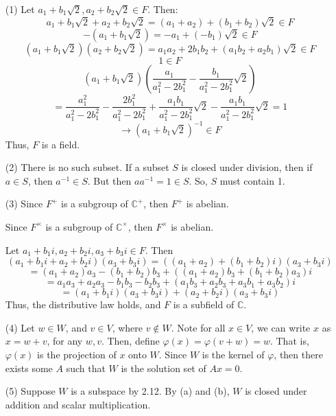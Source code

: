 %
%
\begin{itemize}
\item[(1)]
Let $a_1 + b_1\sqrt{2}, a_2 + b_2\sqrt{2} \in F$. Then:
$$a_1 + b_1\sqrt{2} + a_2 + b_2\sqrt{2} = (a_1 + a_2) + (b_1 + b_2)\sqrt{2} \in F$$
$$-(a_1 + b_1\sqrt{2}) = -a_1 + (-b_1)\sqrt{2} \in F$$
$$(a_1 + b_1\sqrt{2})(a_2 + b_2\sqrt{2}) = a_1a_2 + 2b_1b_2 + (a_1b_2 + a_2b_1)\sqrt{2} \in F$$
$$1 \in F$$
$$\left(a_1 + b_1\sqrt{2}\right)\left(\frac{a_1}{a_1^2 - 2b_1^2} - \frac{b_1}{a_1^2 - 2b_1^2}\sqrt{2}\right)$$
$$=\frac{a_1^2}{a_1^2 - 2b_1^2} - \frac{2b_1^2}{a_1^2 - 2b_1^2} + \frac{a_1b_1}{a_1^2 - 2b_1^2}\sqrt{2} - \frac{a_1b_1}{a_1^2 - 2b_1^2}\sqrt{2} = 1$$
$$\rightarrow (a_1 + b_1\sqrt{2})^{-1} \in F$$
Thus, $F$ is a field.
\item[(2)]
There is no such subset. If a subset $S$ is closed under division, then if $a \in S$, then $a^{-1} \in S$. But then $aa^{-1} = 1 \in S$. So, $S$ must contain 1.
\item[(3)]
Since $F^+$ is a subgroup of $\mathbb{C}^+$, then $F^+$ is abelian.

Since $F^\times$ is a subgroup of $\mathbb{C}^\times$, then $F^\times$ is abelian.

Let $a_1 + b_1i, a_2 + b_2i, a_3 + b_3i \in F$. Then
$$(a_1 + b_1i + a_2 + b_2i)(a_3 + b_3i) = ((a_1 + a_2) + (b_1 + b_2)i)(a_3 + b_3i)$$
$$= (a_1+ a_2)a_3 - (b_1 + b_2)b_3 + ((a_1 +a_2)b_3 + (b_1 + b_2)a_3)i$$
$$= a_1a_3 + a_2a_3 - b_1b_3 - b_2b_3 + (a_1b_3 + a_2b_3 + a_3b_1 + a_3b_2)i$$
$$= (a_1 + b_1i)(a_3 + b_3i) + (a_2 + b_2i)(a_3 + b_3i)$$
Thus, the distributive law holds, and $F$ is a subfield of $\mathbb{C}$.
\item[(4)]
Let $w \in W$, and $v \in V$, where $v \not \in W$. Note for all $x \in V$, we can write $x$ as $x = w + v$, for any $w, v$. Then, define $\varphi(x) = \varphi(v + w) = w$. That is, $\varphi(x)$ is the projection of $x$ onto $W$. Since $W$ is the kernel of $\varphi$, then there exists some $A$ such that $W$ is the solution set of $Ax = 0$.
\item[(5)]
Suppose $W$ is a subspace by 2.12. By (a) and (b), $W$ is closed under addition and scalar multiplication.


\end{itemize}
